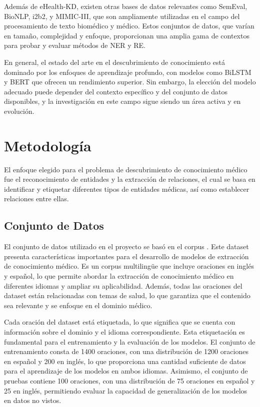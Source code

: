 \documentclass[10pt]{article} %
\begin{document}
	Además de eHealth-KD, existen otras bases de datos relevantes como SemEval, BioNLP, i2b2, y MIMIC-III, que son ampliamente utilizadas en el campo del procesamiento de texto biomédico y médico. Estos conjuntos de datos, que varían en tamaño, complejidad y enfoque, proporcionan una amplia gama de contextos para probar y evaluar métodos de NER y RE.
	
	En general, el estado del arte en el descubrimiento de conocimiento est\'a dominado por los enfoques de aprendizaje profundo, con modelos como BiLSTM y BERT que ofrecen un rendimiento superior. Sin embargo, la elección del modelo adecuado puede depender del contexto específico y del conjunto de datos disponibles, y la investigación en este campo sigue siendo un área activa y en evolución.
	
	\section{Metodolog\'ia}
	
	El enfoque elegido para el problema de descubrimiento de conocimiento médico fue el reconocimiento de entidades y la extracción de relaciones, el cual se basa en identificar y etiquetar diferentes tipos de entidades médicas, así como establecer relaciones entre ellas. 


	\subsection*{Conjunto de Datos}
	El conjunto de datos utilizado en el proyecto se basó en el corpus \cite{corpus}. Este dataset presenta características importantes para el desarrollo de modelos de extracción de conocimiento médico. Es un corpus multilingüe que incluye oraciones en inglés y español, lo que permite abordar la extracción de conocimiento médico en diferentes idiomas y ampliar su aplicabilidad. Además, todas las oraciones del dataset están relacionadas con temas de salud, lo que garantiza que el contenido sea relevante y se enfoque en el dominio médico.
	
	Cada oración del dataset está etiquetada, lo que significa que se cuenta con información sobre el dominio y el idioma correspondiente. Esta etiquetación es fundamental para el entrenamiento y la evaluación de los modelos. El conjunto de entrenamiento consta de 1400 oraciones, con una distribución de 1200 oraciones en español y 200 en inglés, lo que proporciona una cantidad suficiente de datos para el aprendizaje de los modelos en ambos idiomas. Asimismo, el conjunto de pruebas contiene 100 oraciones, con una distribución de 75 oraciones en español y 25 en inglés, permitiendo evaluar la capacidad de generalización de los modelos en datos no vistos.
	
\end{document}
